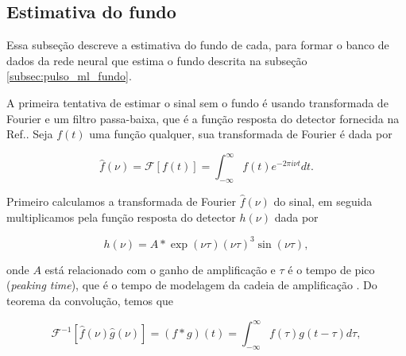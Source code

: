 \documentclass[a4paper,12pt,oneside]{book}
\DeclareMathOperator{\sinc}{sinc}
\begin{document}

\subsection{Estimativa do fundo}\label{subsec:pulses_baseline}

\par Essa subseção descreve a estimativa do fundo de cada, para formar o banco de dados da rede neural que estima o fundo descrita na subseção \ref{subsec:pulso_ml_fundo}.

\par A primeira tentativa de estimar o sinal sem o fundo é usando transformada de Fourier e um filtro passa-baixa, que é a função resposta do detector fornecida na Ref.\cite{GET}. Seja $f(t)$ uma função qualquer, sua transformada de Fourier é dada por

\begin{equation} \label{eq:fourier}
    \hat{f}(\nu)=\mathscr{F}[f(t)]=\int_{-\infty}^{\infty} f(t) e^{-2 \pi i \nu t} d t.
\end{equation}

\par Primeiro calculamos a transformada de Fourier $\hat{f}(\nu)$ do sinal, em seguida multiplicamos pela função resposta do detector $h(\nu)$ dada por\cite{GET}

\begin{equation}
    h(\nu) = A*\exp\left (\nu \tau \right)\left(\nu \tau\right)^3 \sin \left( \nu \tau \right) ,
\end{equation}


\par onde $A$ está relacionado com o ganho de amplificação e $\tau$ é o tempo de pico (\textit{peaking time}), que é o tempo de modelagem da cadeia de amplificação \cite{GET}. Do teorema da convolução, temos que \cite{metodos_mat_aplicada}


\begin{equation}
    \mathscr{F}^{-1}[\hat{f}(\nu) \hat{g}(\nu)]=(f * g)(t)=\int_{-\infty}^{\infty} f(\tau) g(t-\tau) d \tau, 
\end{equation}
\end{document}
